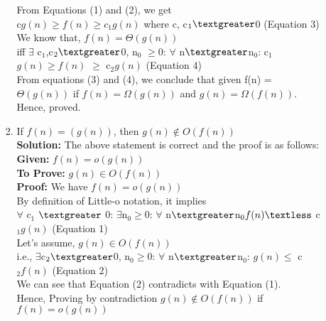 \documentclass[12pt]{article}
\begin{document}
\begin{enumerate}
\begin{enumerate}
\begin{enumerate}
From Equations (1) and (2), we get \\
c$g(n) \ge f(n) \ge c_{1}g(n)$ where c, c$_{1}\textgreater$0            
\hfill (Equation 3)\\        
We know that, $f(n) = \Theta(g(n)) $\\
iff  $\exists$ c$_{1}$,c$_{2} \textgreater$0, n$_{0}$ $\ge$0: $\forall$ n$\textgreater$n$_{0}$: c$_{1}$$g(n) \ge f(n)$ $\ge$ c$_{2}g(n)$
\hfill (Equation 4)\\

From equations (3) and (4), we conclude that given f(n) = $\Theta(g(n))$ if $f(n) = \Omega(g(n))$ and $g(n) = \Omega(f(n))$.
Hence, proved.		

\item 
{If $f(n) = (g(n))$, then $g(n) \not \in O(f(n))$}\\
\textbf{Solution:} The above statement is correct and the proof is as follows:\\            
\textbf{Given:}  $f(n) = o(g(n))$ \\       
\textbf{To Prove:} $g(n) \in O(f(n))$\\
\textbf{Proof:} We have $f(n) = o(g(n))$ \\ 
By definition of Little-o notation, it implies\\
$\forall$ c$_{1}$ $\textgreater$ 0: $\exists$n$_{0}\ge$0: $\forall$ n$\textgreater$n$_{0} f(n) \textless$ c$_{1}$$g(n)$   \hfill (Equation 1) \\                        
Let’s assume, $g(n) \in O(f(n))$ \\
i.e., $\exists$c$_{2}\textgreater$0, n$_{0}\ge$0: $\forall$ n$\textgreater$n$_{0}$:  
$g(n) \le$ c$_{2}f(n)$ \hfill (Equation 2)\\
We can see that Equation (2) contradicts with Equation (1).\\
Hence, Proving by contradiction $g(n) \not \in O(f(n))$ if $f(n) = o(g(n))$


\end{enumerate}
\end{enumerate}
\end{enumerate}
\end{document}
